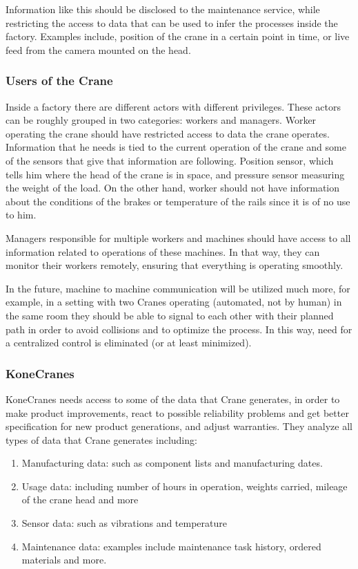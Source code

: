 Information like this should be disclosed to the maintenance service, while
restricting the access to data that can be used to infer the processes inside the factory. Examples include, position of the crane in a certain
point in time, or live feed from the camera mounted on the head.

\subsubsection{Users of the Crane}

Inside a factory there are different actors with different privileges. These actors can be roughly grouped in two categories: workers and managers. 
Worker operating the crane should have restricted access to data the crane operates. Information that he needs is tied to the current operation of the crane and some of the sensors that give that information are following. Position sensor, which tells him where the head of the crane is in space, and pressure sensor measuring the weight of the load. On the other hand, worker should not have information about the conditions of the brakes or temperature of the rails since it is of no use to him.

Managers responsible for multiple workers and machines should have access to all information related to operations of these machines. In that way, they can monitor their workers remotely, ensuring that everything is operating smoothly.

In the future, machine to machine communication will be utilized much more, for example, 
in a setting with two Cranes operating (automated, not by human) in the same room they 
should be able to signal to each other with their planned path in order to avoid collisions
and to optimize the process. In this way, need for a centralized control is eliminated (or at
least minimized).

\subsubsection{KoneCranes}

KoneCranes needs access to some of the data that Crane generates, in order to make product improvements, react to possible reliability problems and get better specification for new product generations, and adjust warranties.
They analyze all types of data that Crane generates including: 

\begin{enumerate}
	\setlength{\itemsep}{1pt}
	\item Manufacturing data: such as component lists and manufacturing dates.
	\item Usage data: including number of hours in operation, weights carried, mileage of the crane head and more
	\item Sensor data: such as vibrations and temperature
	\item Maintenance data: examples include maintenance task history, ordered materials and more.
\end{enumerate}

